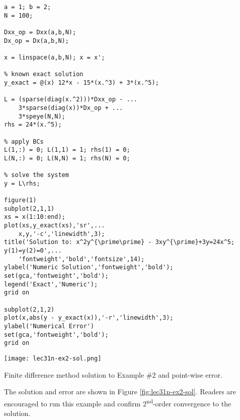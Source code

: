 \begin{lstlisting}[style=myMatlab,name=lec31n-ex2]
a = 1; b = 2;
N = 100;

Dxx_op = Dxx(a,b,N);
Dx_op = Dx(a,b,N);

x = linspace(a,b,N); x = x';

% known exact solution
y_exact = @(x) 12*x - 15*(x.^3) + 3*(x.^5);

L = (sparse(diag(x.^2)))*Dxx_op - ...
    3*sparse(diag(x))*Dx_op + ...
    3*speye(N,N);
rhs = 24*(x.^5);

% apply BCs
L(1,:) = 0; L(1,1) = 1; rhs(1) = 0;
L(N,:) = 0; L(N,N) = 1; rhs(N) = 0;

% solve the system
y = L\rhs;

figure(1)
subplot(2,1,1)
xs = x(1:10:end);
plot(xs,y_exact(xs),'sr',...
    x,y,'-c','linewidth',3);
title('Solution to: x^2y^{\prime\prime} - 3xy^{\prime}+3y=24x^5;  y(1)=y(2)=0',...
    'fontweight','bold','fontsize',14);
ylabel('Numeric Solution','fontweight','bold');
set(gca,'fontweight','bold');
legend('Exact','Numeric');
grid on

subplot(2,1,2)
plot(x,abs(y - y_exact(x)),'-r','linewidth',3);
ylabel('Numerical Error')
set(gca,'fontweight','bold');
grid on
\end{lstlisting}
\begin{marginfigure}[-4.0cm]
\texttt{[image: lec31n-ex2-sol.png]}
\caption{Finite difference method solution to Example \#2 and point-wise error.}
\label{fig:lec31n-ex2-sol}
\end{marginfigure}
The solution and error are shown in Figure \ref{fig:lec31n-ex2-sol}.  Readers are encouraged to run this example and confirm 2\textsuperscript{nd}-order convergence to the solution.

